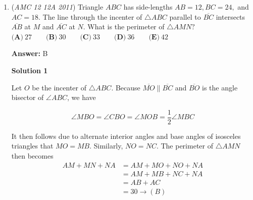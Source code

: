 \begin{enumerate}
 From this, we have that the boat travels a distance $d$ at rate $b$ with respect to the raft both on the way to $B$ and on the way back. Thus, using $\dfrac{distance}{speed}=time$, we have $\dfrac{2d}{b}=9\text{ hours}$, and to see how long it took to travel half the distance, we have $\dfrac{d}{b}=4.5\text{ hours}\implies\boxed{\textbf{D}}$




\textbf{Solution 3}

Let $t$ be the time it takes the power boat to go from $A$ to $B$ in hours, $r$ be the speed of the river current (and thus also the raft), and $p$ to be the speed of the power boat with respect to the river. 

 Using $d = rt$, the raft covers a distance of $9r$, the distance from $A$ to $B$ is $(p + r)t$, and the distance from $B$ to where the raft and power boat met up is $(9 - t)(p - r)$. 

 Then, $9r + (9 - t)(p - r) = (p + r)t$. Solving for $t$, we get $t = 4.5$, which is $\boxed{\textbf{D}}$.

 


 


	\item (\textit{AMC 12 12A 2011}) Triangle $ABC$ has side-lengths $AB = 12, BC = 24,$ and $AC = 18.$ The line through the incenter of $\triangle ABC$ parallel to $\overline{BC}$ intersects $\overline{AB}$ at $M$ and $\overline{AC}$ at $N.$ What is the perimeter of $\triangle AMN?$
$\textbf{(A)}\ 27 \qquad \textbf{(B)}\ 30 \qquad \textbf{(C)}\  33 \qquad \textbf{(D)}\ 36 \qquad \textbf{(E)}\ 42$

 \textbf{Answer: }B



\textbf{Solution 1}

Let $O$ be the incenter of $\triangle{ABC}$. Because $\overline{MO} \parallel \overline{BC}$ and $\overline{BO}$ is the angle bisector of $\angle{ABC}$, we have 

 
 \[\angle{MBO} = \angle{CBO} = \angle{MOB} = \frac{1}{2}\angle{MBC}\]

 It then follows due to alternate interior angles and base angles of isosceles triangles that $MO = MB$. Similarly, $NO = NC$. The perimeter of $\triangle{AMN}$ then becomes
 \begin{align*} AM + MN + NA &= AM + MO + NO + NA \\ &= AM + MB + NC + NA \\ &= AB + AC \\ &= 30 \rightarrow \boxed{(B)} \end{align*}






\end{enumerate}
